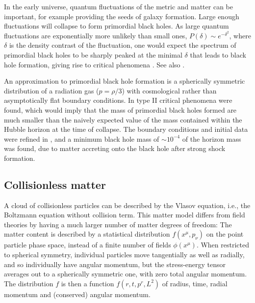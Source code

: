 \documentclass{article}
\begin{document}
In the early universe, quantum fluctuations of the metric and
matter can be important, for example providing the seeds of galaxy
formation. Large enough fluctuations will collapse to form primordial
black holes. As large quantum fluctuations are exponentially more
unlikely than small ones, $P(\delta)\sim e^{-\delta^2}$, where
$\delta$ is the density contrast of the fluctuation, one would expect
the spectrum of primordial black holes to be sharply peaked at the
minimal $\delta$ that leads to black hole formation, giving rise to
critical phenomena \cite{NiemeyerJedamzik}. See also
\cite{GreenLiddle,Yokoyama}. 

An approximation to primordial black hole formation is a spherically
symmetric distribution of a radiation gas ($p=\rho/3$) with
cosmological rather than asymptotically flat boundary conditions. In
\cite{NiemeyerJedamzik,NiemeyerJedamzik2} type II critical phenomena
were found, which would imply that the mass of primordial black holes
formed are much smaller than the naively expected value of the mass
contained within the Hubble horizon at the time of collapse. The
boundary conditions and initial data were refined in
\cite{HawkeStewart,MuscoMiller}, and a minimum black hole mass of
$\sim 10^{-4}$ of the horizon mass was found, due to matter accreting
onto the black hole after strong shock formation.


\subsection{Collisionless matter}

A cloud of collisionless particles can be described by the Vlasov
equation, i.e., the Boltzmann equation without collision term.
This matter model differs from field theories by having a much larger
number of matter degrees of freedom: The matter content is described
by a statistical distribution $f(x^\mu, p_\nu)$ on the point particle
phase space, instead of a finite number of fields $\phi(x^\mu)$.
When restricted to spherical symmetry, individual particles move
tangentially as well as radially, and so individually have angular
momentum, but the stress-energy tensor averages out to a spherically
symmetric one, with zero total angular momentum. The distribution
$f$ is then a function $f(r,t,p^r,L^2)$ of radius, time, radial
momentum and (conserved) angular momentum.
\end{document}
